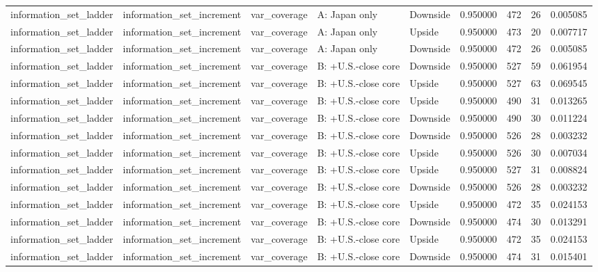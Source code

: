 \begin{tabular}{lllllrrr}
information\_set\_ladder & information\_set\_increment & var\_coverage & A: Japan only & Downside & 0.950000 & 472 & 26 & 0.005085 \\
information\_set\_ladder & information\_set\_increment & var\_coverage & A: Japan only & Upside & 0.950000 & 473 & 20 & 0.007717 \\
information\_set\_ladder & information\_set\_increment & var\_coverage & A: Japan only & Downside & 0.950000 & 472 & 26 & 0.005085 \\
information\_set\_ladder & information\_set\_increment & var\_coverage & B: +U.S.-close core & Downside & 0.950000 & 527 & 59 & 0.061954 \\
information\_set\_ladder & information\_set\_increment & var\_coverage & B: +U.S.-close core & Upside & 0.950000 & 527 & 63 & 0.069545 \\
information\_set\_ladder & information\_set\_increment & var\_coverage & B: +U.S.-close core & Upside & 0.950000 & 490 & 31 & 0.013265 \\
information\_set\_ladder & information\_set\_increment & var\_coverage & B: +U.S.-close core & Downside & 0.950000 & 490 & 30 & 0.011224 \\
information\_set\_ladder & information\_set\_increment & var\_coverage & B: +U.S.-close core & Downside & 0.950000 & 526 & 28 & 0.003232 \\
information\_set\_ladder & information\_set\_increment & var\_coverage & B: +U.S.-close core & Upside & 0.950000 & 526 & 30 & 0.007034 \\
information\_set\_ladder & information\_set\_increment & var\_coverage & B: +U.S.-close core & Upside & 0.950000 & 527 & 31 & 0.008824 \\
information\_set\_ladder & information\_set\_increment & var\_coverage & B: +U.S.-close core & Downside & 0.950000 & 526 & 28 & 0.003232 \\
information\_set\_ladder & information\_set\_increment & var\_coverage & B: +U.S.-close core & Upside & 0.950000 & 472 & 35 & 0.024153 \\
information\_set\_ladder & information\_set\_increment & var\_coverage & B: +U.S.-close core & Downside & 0.950000 & 474 & 30 & 0.013291 \\
information\_set\_ladder & information\_set\_increment & var\_coverage & B: +U.S.-close core & Upside & 0.950000 & 472 & 35 & 0.024153 \\
information\_set\_ladder & information\_set\_increment & var\_coverage & B: +U.S.-close core & Downside & 0.950000 & 474 & 31 & 0.015401 \\

\end{tabular}
